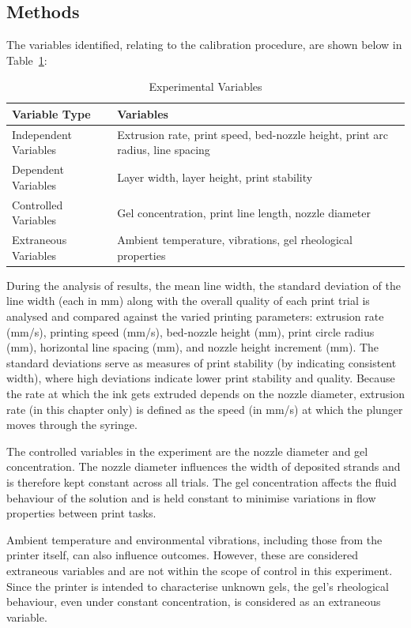 \subsection{Methods}

The variables identified, relating to the calibration procedure, are shown below in Table~\ref{tab:variables}:

\begin{longtable}{>{\raggedright\arraybackslash}p{4cm} p{10cm}}
\caption{Experimental Variables} \label{tab:variables}\\
\hline
\textbf{Variable Type} & \textbf{Variables} \\
\hline
Independent Variables & Extrusion rate, print speed, bed-nozzle height, print arc radius, line spacing \\
Dependent Variables   & Layer width, layer height, print stability \\
Controlled Variables  & Gel concentration, print line length, nozzle diameter \\
Extraneous Variables  & Ambient temperature, vibrations, gel rheological properties \\
\hline
\end{longtable}

During the analysis of results, the mean line width, the standard deviation of the line width (each in mm) along with the overall quality of each print trial is analysed and compared against the varied printing parameters: extrusion rate (mm/s), printing speed (mm/s), bed-nozzle height (mm), print circle radius (mm), horizontal line spacing (mm), and nozzle height increment (mm). The standard deviations serve as measures of print stability (by indicating consistent width), where high deviations indicate lower print stability and quality. Because the rate at which the ink gets extruded depends on the nozzle diameter, extrusion rate (in this chapter only) is defined as the speed (in mm/s) at which the plunger moves through the syringe.

The controlled variables in the experiment are the nozzle diameter and gel concentration. The nozzle diameter influences the width of deposited strands and is therefore kept constant across all trials. The gel concentration affects the fluid behaviour of the solution and is held constant to minimise variations in flow properties between print tasks.

Ambient temperature and environmental vibrations, including those from the printer itself, can also influence outcomes. However, these are considered extraneous variables and are not within the scope of control in this experiment. Since the printer is intended to characterise unknown gels, the gel's rheological behaviour, even under constant concentration, is considered as an extraneous variable.

